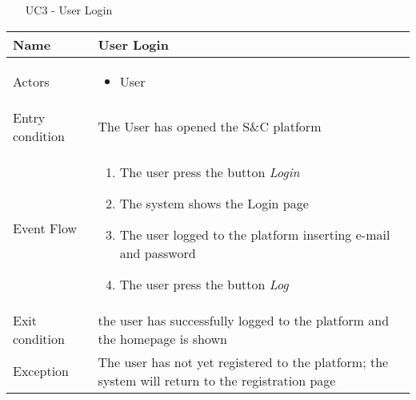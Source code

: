 		
			
			\begin{table} [H]
				\centering
					\begin{itemize}
					\item [UC3] - User Login
				\end{itemize}
				\begin{tabular}{|| P{7.5cm} | P{7.5cm} ||}
					\hline
					Name & User Login \\
					\hline
					Actors & \parbox{5cm}{\begin{itemize}
							\item User
						\end{itemize}
					} \\
					\hline
					Entry condition & The User has opened the S\&C platform \\
					\hline
					Event Flow & \parbox{5cm}{\begin{enumerate}[label=\alpha]
							\item The user press the button \textit{Login}
							\item The system shows the Login page
							\item The user logged to the platform 
							inserting e-mail and password 
							\item The user press the button \textit{Log}
					\end{enumerate}} \\
					\hline 
					Exit condition & the user has successfully logged to the 
					platform and the homepage is shown \\
					\hline
					Exception & The user has not yet registered to the 
					platform; the system will return to the 
					registration page \\
					\hline
				\end{tabular}
			\end{table}
			
		
			
